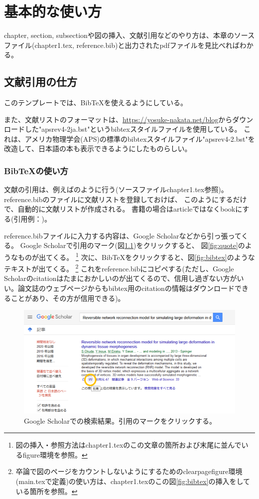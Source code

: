 \chapter{基本的な使い方}
chapter, section, subsectionや図の挿入、文献引用などのやり方は、本章のソースファイル(chapter1.tex, reference.bib)と出力されたpdfファイルを見比べればわかる。
\section{文献引用の仕方}
このテンプレートでは、BibTeXを使えるようにしている。

また、文献リストのフォーマットは、\url{https://yosuke-nakata.net/blog}からダウンロードした"apsrev4-2ja.bst"というbibtexスタイルファイルを使用している。
これは、アメリカ物理学会(APS)の標準のbibtexスタイルファイル"apsrev4-2.bst"を改造して、日本語の本も表示できるようにしたものらしい。
\subsection{BibTeXの使い方}
文献の引用は、例えば\cite{Okuda2013a}のように行う(ソースファイルchapter1.tex参照)。
reference.bibのファイルに文献リストを登録しておけば、
このようにするだけで、自動的に文献リストが作成される。
書籍の場合はarticleではなくbookにする(引用例：\cite{Kobayashi1977})。

reference.bibファイルに入力する内容は、Google Scholarなどから引っ張ってくる。
Google Scholarで引用のマーク(図\ref{fig:googleScholar})をクリックすると、
図\ref{fig:quote}のようなものが出てくる。
\footnote{図の挿入・参照方法はchapter1.texのこの文章の箇所および末尾に並んでいるfigure環境を参照。}
次に、BibTeXをクリックすると、図\ref{fig:bibtex}のようなテキストが出てくる。
\footnote{卒論で図のページをカウントしないようにするためのclearpagefigure環境(main.texで定義)の使い方は、chapter1.texのこの図\ref{fig:bibtex}の挿入をしている箇所を参照。}
これをreference.bibにコピペする(ただし、Google Scholarのcitationはたまにおかしいのが出てくるので、信用し過ぎない方がいい。論文誌のウェブページからもbibtex用のcitationの情報はダウンロードできることがあり、その方が信用できる)。

\begin{figure}[htbp]
	\centering
	\includegraphics[width=12cm,clip]{fig/googleScholar.png}
	\caption{Google Scholarでの検索結果。引用のマークをクリックする。}
	\label{fig:googleScholar}
\end{figure}

